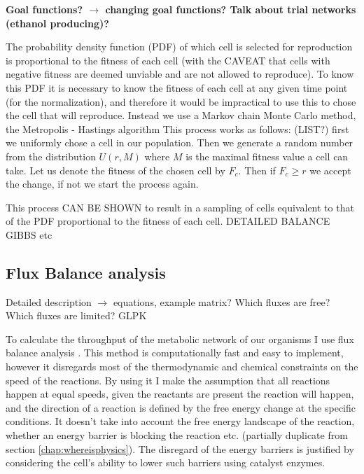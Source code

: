 \documentclass[10pt,a4paper]{article}
\begin{document}
\textbf{Goal functions? $\rightarrow$ changing goal functions? Talk about trial networks (ethanol producing)?}

The probability density function (PDF) of which cell is selected for reproduction is proportional to the fitness of each cell (with the CAVEAT that cells with negative fitness are deemed unviable and are not allowed to reproduce). To know this PDF it is necessary to know the fitness of each cell at any given time point (for the normalization), and therefore it would be impractical to use this to chose the cell that will reproduce. Instead we use a Markov chain Monte Carlo method, the Metropolis - Hastings algorithm This process works as follows: (LIST?) first we uniformly chose a cell in our population. Then we generate a random number from the distribution $U \left( r,M \right)$ where $M$ is the maximal fitness value a cell can take. Let us denote the fitness of the chosen cell by $F_c$. Then if $F_c \geq r$ we accept the change, if not we start the process again. 

This process CAN BE SHOWN to result in a sampling of cells equivalent to that of the PDF proportional to the fitness of each cell. DETAILED BALANCE ~ GIBBS etc

\subsection{Flux Balance analysis}
\label{sub:Flux Balance analysis}

Detailed description $\rightarrow$ equations, example matrix? Which fluxes are free? Which fluxes are limited? GLPK 



	To calculate the throughput of the metabolic network of our organisms I use flux balance analysis \cite{whatisfluxbalance}. This method is computationally fast and easy to implement, however it disregards most of the thermodynamic and chemical constraints on the speed of the reactions. By using it I make the assumption that all reactions happen at equal speeds, given the reactants are present the reaction will happen, and the direction of a reaction is defined by the free energy change at the specific conditions. It doesn't take into account the free energy landscape of the reaction, whether an energy barrier is blocking the reaction etc. (partially duplicate from section \ref{chap:whereisphysics}). The disregard of the energy barriers is justified by considering the cell's ability to lower such barriers using catalyst enzymes.
	
\end{document}
